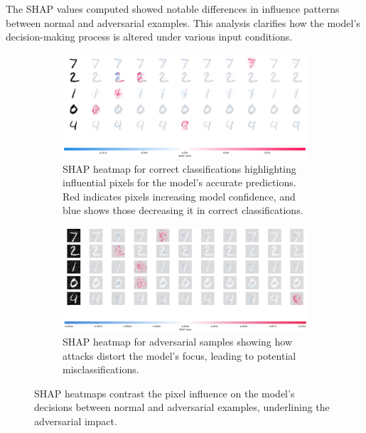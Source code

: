 \documentclass[10pt, conference, a4paper, final]{IEEEtran}
\begin{document}
The SHAP values computed showed notable differences in influence patterns between normal and adversarial examples. This analysis clarifies 
how the model's decision-making process is altered under various input conditions.

\begin{figure}[h]
    \centering
    \begin{subfigure}{\columnwidth}
        \centering
        \includegraphics[width=\linewidth]{paper_images/correctshap.png}
        \caption{SHAP heatmap for correct classifications highlighting influential pixels for the model's accurate predictions.
        Red indicates pixels increasing model confidence, and blue shows those decreasing it in correct classifications.}
        \label{fig:correct_shap}
    \end{subfigure}
    \par\medskip %
    \begin{subfigure}{\columnwidth}
        \centering
        \includegraphics[width=\linewidth]{paper_images/adversarial.png}
        \caption{SHAP heatmap for adversarial samples showing how attacks distort the model's focus, leading to potential misclassifications.}
        \label{fig:adversarial}
    \end{subfigure}
    \caption{SHAP heatmaps contrast the pixel influence on the model's decisions between normal and adversarial examples, underlining the adversarial impact.}
    \label{fig:both_shap_figures}
\end{figure}
\end{document}
